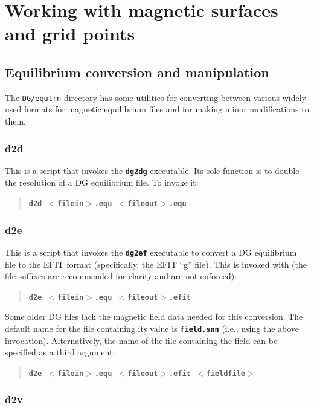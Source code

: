 \documentclass[12pt]{report}
\begin{document}
\chapter{Working with magnetic surfaces and grid points}

\section{Equilibrium conversion and manipulation}
\label{equtrn}

The \texttt{DG/equtrn} 
directory has some utilities for converting between various
widely used formats for magnetic equilibrium files and for making minor
modifications to them.

\subsection{d2d}

This is a script that invokes the \textbf{\texttt{dg2dg}} executable.  Its sole
function is to double the resolution of a DG equilibrium file.  To 
invoke it:
\begin{quote}
\textbf{\texttt{d2d $<$filein$>$.equ $<$fileout$>$.equ}}
\end{quote}
\subsection{d2e}

This is a script that invokes the \textbf{\texttt{dg2ef}} 
executable to convert a
DG equilibrium file to the EFIT format (specifically, the EFIT ``g'' file).
This is invoked with (the file suffixes are recommended for clarity
and are not enforced):
\begin{quote}
\textbf{\texttt{d2e $<$filein$>$.equ $<$fileout$>$.efit}}
\end{quote}
Some older DG files lack the magnetic field data needed for this conversion.
The default name for the file containing its value is 
\textbf{\texttt{field.snn}} (i.e., using the above invocation).  
Alternatively, the name of the file containing the field can be 
specified as a third argument:
\begin{quote}
\textbf{\texttt{d2e $<$filein$>$.equ $<$fileout$>$.efit $<$fieldfile$>$}}
\end{quote}
\subsection{d2v}
\end{document}
